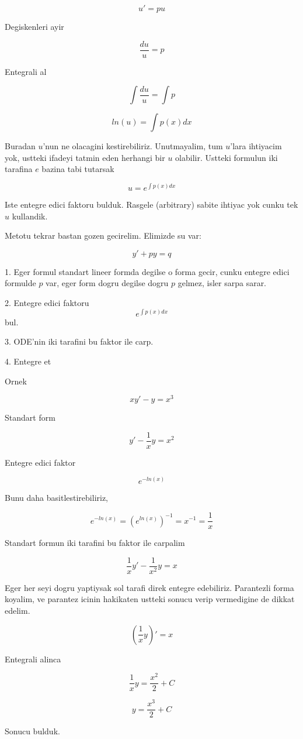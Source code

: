 \documentclass[12pt,fleqn]{article}
\begin{document}
\[ u' = pu \]

Degiskenleri ayir

\[ \frac{du}{u} = p \]

Entegrali al

\[ \int \frac{du}{u}  = \int p \]

\[ ln (u) = \int p(x) dx \]

Buradan $u$'nun ne olacagini kestirebiliriz. Unutmayalim, tum $u$'lara
ihtiyacim yok, ustteki ifadeyi tatmin eden herhangi bir $u$
olabilir. Ustteki formulun iki tarafina $e$ bazina tabi tutarsak

\[ u = e^{\int p(x) dx} \]

Iste entegre edici faktoru bulduk. Rasgele (arbitrary) sabite ihtiyac
yok cunku tek $u$ kullandik.

Metotu tekrar bastan gozen gecirelim. Elimizde su var:

\[ y'+py = q \]

1. Eger formul standart lineer formda degilse o forma gecir, cunku
entegre edici formulde $p$ var, eger form dogru degilse dogru $p$
gelmez, isler sarpa sarar.

2. Entegre edici faktoru \[ e^{\int p(x) dx} \] bul.

3. ODE'nin iki tarafini bu faktor ile carp.

4. Entegre et

Ornek

\[ xy' - y= x^3 \]

Standart form

\[ y' - \frac{1}{x}y = x^2 \]

Entegre edici faktor

\[ e^{-ln(x)} \]

Bunu daha basitlestirebiliriz,

\[ e^{-ln(x)} = (e^{ln(x)})^{-1} = x^{-1} = \frac{1}{x}  \]

Standart formun iki tarafini bu faktor ile carpalim

\[ \frac{1}{x}y' - \frac{1}{x^2}y = x \]

Eger her seyi dogru yaptiysak sol tarafi direk entegre
edebiliriz. Parantezli forma koyalim, ve parantez icinin hakikaten
ustteki sonucu verip vermedigine de dikkat edelim.

\[ (\frac{1}{x}y)' = x \]

Entegrali alinca

\[ \frac{1}{x}y = \frac{x^2}{2} + C \]

\[ y = \frac{x^3}{2} + C \]

Sonucu bulduk.
\end{document}
